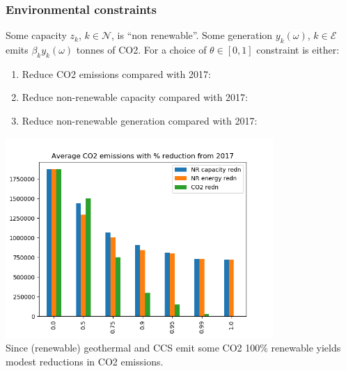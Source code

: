 \documentclass[xcolor=dvipsnames]{beamer}
\newcommand{\expect}{\mathbb{E}}
\newcommand{\blue}[1]{{\color{blue} #1}}
\newcommand{\green}[1]{{\color{OliveGreen!100} #1}}
\newcommand{\orange}[1]{{\color{orange} #1}}
\begin{document}
\begin{frame}
  \frametitle{Environmental constraints}
Some capacity $z_k$, $k \in \mathcal{N}$, is ``non renewable''.
Some generation $y_k (\omega)$, $k \in \mathcal{E}$ emits $\beta_k y_k
(\omega)$ tonnes of CO2. For a choice of $\theta \in [0, 1]$
constraint is either:
\begin{enumerate}
\item Reduce \alert{CO2 emissions} compared with 2017:
\item Reduce \alert{non-renewable capacity} compared with 2017:
\item Reduce \alert{non-renewable generation} compared with 2017:
\end{enumerate}
\end{frame}

\begin{frame}
  \centering
  \includegraphics[width=4.0in]{includes/TotalCarbonv20.png} \\
  Since (renewable) geothermal and CCS emit some CO2 100\% renewable yields modest reductions in CO2 emissions.
\end{frame}
\end{document}
